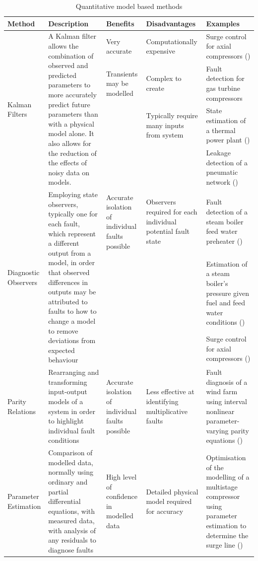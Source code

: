 \begin{table}
\caption{Quantitative model based methods}
\begin{tabular}{p{}p{}p{}p{}p{}}
\toprule
Method &	Description&	Benefits&	Disadvantages&	Examples \\
\toprule
\multirow{4}{.18\textwidth}{Kalman Filters} &\multirow{4}{.18\textwidth}{A Kalman filter allows the combination of observed and predicted parameters to more accurately predict future parameters than with a physical model alone. It also allows for the reduction of the effects of noisy data on models.} & Very accurate&	Computationally expensive&	Surge control for axial compressors (\cite{Backi2013})\\
&  &  Transients may be modelled&	Complex to create&	Fault detection for gas turbine compressors \cite{Salar2010} \\
& & & Typically require many inputs from system	&State estimation of a thermal power plant (\cite{Nair2011})\\
& & & & Leakage detection of a pneumatic network (\cite{Krichel2011})\\
\midrule
\multirow{3}{.18\textwidth}{Diagnostic Observers} & \multirow{3}{.18\textwidth}{Employing state observers, typically one for each fault, which represent a different output from a model, in order that observed differences in outputs may be attributed to faults to how to change a model to remove deviations from expected behaviour} & Accurate isolation of individual faults possible &	Observers required for each individual potential fault state &	Fault detection of a steam boiler feed water preheater (\cite{Tarantino2000})\\
 & & & & Estimation of a steam boiler’s pressure given fuel and feed water conditions (\cite{Ramezanifar2006})\\
 & & & & Surge control for axial compressors (\cite{Backi2013})\\
 \midrule
Parity Relations &	Rearranging and transforming input-output models of a system in order to highlight individual fault conditions &	Accurate isolation of individual faults possible &	Less effective at identifying multiplicative faults &	Fault diagnosis of a wind farm using interval nonlinear parameter-varying parity equations (\cite{Blesa2014})\\
\midrule
Parameter Estimation & Comparison of modelled data, normally using ordinary and partial differential equations, with measured data, with analysis of any residuals to diagnose faults
 & High level of confidence in modelled data & Detailed physical model required for accuracy & Optimisation of the modelling of a multistage compressor using parameter estimation to determine the surge line (\cite{DapengNiu2011}) \\
\bottomrule
\end{tabular}
\label{tab:quantimodel}
\end{table}

